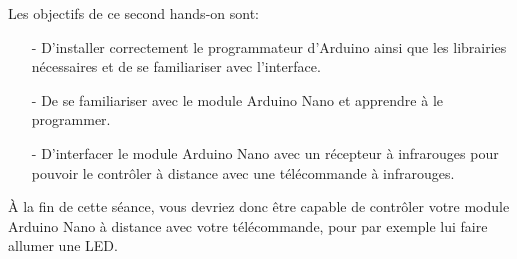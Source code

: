 Les objectifs de ce second hands-on sont:
\begin{itemize}
	\item[-] D'installer correctement le programmateur d'Arduino ainsi que les librairies nécessaires et de se familiariser avec l'interface.
	\item[-] De se familiariser avec le module Arduino Nano et apprendre à le programmer.
	\item[-] D'interfacer le module Arduino Nano avec un récepteur à infrarouges pour pouvoir le contrôler à distance avec une télécommande à infrarouges.
\end{itemize}

À la fin de cette séance, vous devriez donc être capable de contrôler votre module Arduino Nano à distance avec votre télécommande, pour par exemple lui faire allumer une LED.